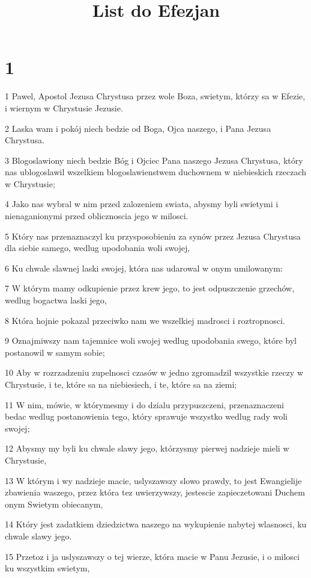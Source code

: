 

\title{List do Efezjan}


\chapter{1}

\par 1 Pawel, Apostol Jezusa Chrystusa przez wole Boza, swietym, którzy sa w Efezie, i wiernym w Chrystusie Jezusie.
\par 2 Laska wam i pokój niech bedzie od Boga, Ojca naszego, i Pana Jezusa Chrystusa.
\par 3 Blogoslawiony niech bedzie Bóg i Ojciec Pana naszego Jezusa Chrystusa, który nas ublogoslawil wszelkiem blogoslawienstwem duchownem w niebieskich rzeczach w Chrystusie;
\par 4 Jako nas wybral w nim przed zalozeniem swiata, abysmy byli swietymi i nienaganionymi przed oblicznoscia jego w milosci.
\par 5 Który nas przenaznaczyl ku przysposobieniu za synów przez Jezusa Chrystusa dla siebie samego, wedlug upodobania woli swojej,
\par 6 Ku chwale slawnej laski swojej, która nas udarowal w onym umilowanym:
\par 7 W którym mamy odkupienie przez krew jego, to jest odpuszczenie grzechów, wedlug bogactwa laski jego,
\par 8 Która hojnie pokazal przeciwko nam we wszelkiej madrosci i roztropnosci.
\par 9 Oznajmiwszy nam tajemnice woli swojej wedlug upodobania swego, które byl postanowil w samym sobie;
\par 10 Aby w rozrzadzeniu zupelnosci czasów w jedno zgromadzil wszystkie rzeczy w Chrystusie, i te, które sa na niebiesiech, i te, które sa na ziemi;
\par 11 W nim, mówie, w którymesmy i do dzialu przypuszczeni, przenaznaczeni bedac wedlug postanowienia tego, który sprawuje wszystko wedlug rady woli swojej;
\par 12 Abysmy my byli ku chwale slawy jego, którzysmy pierwej nadzieje mieli w Chrystusie,
\par 13 W którym i wy nadzieje macie, uslyszawszy slowo prawdy, to jest Ewangielije zbawienia waszego, przez która tez uwierzywszy, jestescie zapieczetowani Duchem onym Swietym obiecanym,
\par 14 Który jest zadatkiem dziedzictwa naszego na wykupienie nabytej wlasnosci, ku chwale slawy jego.
\par 15 Przetoz i ja uslyszawszy o tej wierze, która macie w Panu Jezusie, i o milosci ku wszystkim swietym,
